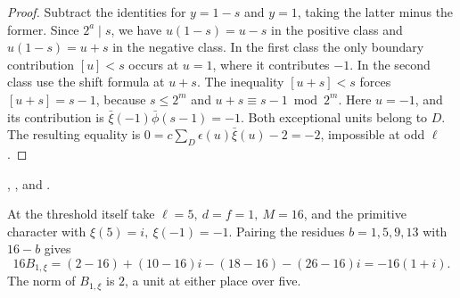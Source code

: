 \begin{proof}
Subtract the identities for \(y=1-s\) and \(y=1\), taking the latter
minus the former. Since \(2^a\mid s\), we have \(u(1-s)=u-s\)
in the positive class and \(u(1-s)=u+s\) in the negative class.
In the first class the only boundary contribution \([u]<s\) occurs
at \(u=1\), where it contributes \(-1\). In the second class use the
shift formula at \(u+s\). The inequality \([u+s]<s\) forces
\([u+s]=s-1\), because \(s\le2^m\) and \(u+s\equiv s-1\bmod 2^m\).
Here \(u=-1\), and its contribution is
\(\bar\xi(-1)\bar\phi(s-1)=-1\). Both exceptional units belong to
\(D\). The resulting equality is
\(0=c\sum_D\epsilon(u)\bar\xi(u)-2=-2\), impossible at odd \(\ell\).
\end{proof}
,
, and
.

At the threshold itself take \(\ell=5,\ d=f=1,\ M=16\), and the
primitive character with \(\xi(5)=i,\ \xi(-1)=-1\).
Pairing the residues \(b=1,5,9,13\) with \(16-b\) gives
\[
 16B_{1,\xi}=(2-16)+(10-16)i-(18-16)-(26-16)i=-16(1+i).
\]
The norm of \(B_{1,\xi}\) is \(2\), a unit at either place over five.

